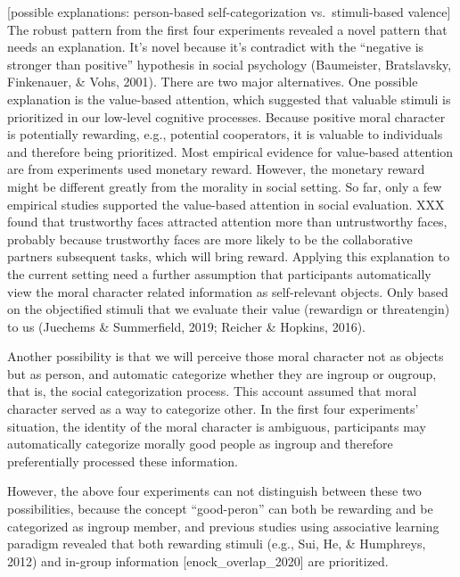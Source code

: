 \documentclass[
  english,
  man]{apa6}
\begin{document}
{[}possible explanations: person-based self-categorization vs.~stimuli-based valence{]} The robust pattern from the first four experiments revealed a novel pattern that needs an explanation. It's novel because it's contradict with the ``negative is stronger than positive'' hypothesis in social psychology (Baumeister, Bratslavsky, Finkenauer, \& Vohs, 2001). There are two major alternatives. One possible explanation is the value-based attention, which suggested that valuable stimuli is prioritized in our low-level cognitive processes. Because positive moral character is potentially rewarding, e.g., potential cooperators, it is valuable to individuals and therefore being prioritized. Most empirical evidence for value-based attention are from experiments used monetary reward. However, the monetary reward might be different greatly from the morality in social setting. So far, only a few empirical studies supported the value-based attention in social evaluation. XXX found that trustworthy faces attracted attention more than untrustworthy faces, probably because trustworthy faces are more likely to be the collaborative partners subsequent tasks, which will bring reward. Applying this explanation to the current setting need a further assumption that participants automatically view the moral character related information as self-relevant objects. Only based on the objectified stimuli that we evaluate their value (rewardign or threatengin) to us (Juechems \& Summerfield, 2019; Reicher \& Hopkins, 2016).

Another possibility is that we will perceive those moral character not as objects but as person, and automatic categorize whether they are ingroup or ougroup, that is, the social categorization process. This account assumed that moral character served as a way to categorize other. In the first four experiments' situation, the identity of the moral character is ambiguous, participants may automatically categorize morally good people as ingroup and therefore preferentially processed these information.

However, the above four experiments can not distinguish between these two possibilities, because the concept ``good-peron'' can both be rewarding and be categorized as ingroup member, and previous studies using associative learning paradigm revealed that both rewarding stimuli (e.g., Sui, He, \& Humphreys, 2012) and in-group information {[}enock\_overlap\_2020{]} are prioritized.
\end{document}

